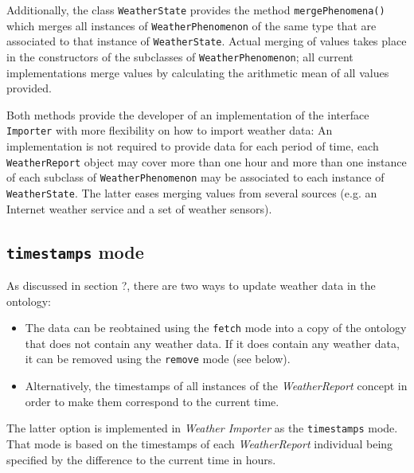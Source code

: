 Additionally, the class \texttt{WeatherState} provides the method \texttt{mergePhenomena()} which merges all instances of \texttt{WeatherPhenomenon} of the same type that are associated to that instance of \texttt{WeatherState}. Actual merging of values takes place in the constructors of the subclasses of \texttt{WeatherPhenomenon}; all current implementations merge values by calculating the arithmetic mean of all values provided.

Both methods provide the developer of an implementation of the interface \texttt{Importer} with more flexibility on how to import weather data: An implementation is not required to provide data for each period of time, each \texttt{WeatherReport} object may cover more than one hour and more than one instance of each subclass of \texttt{WeatherPhenomenon} may be associated to each instance of \texttt{WeatherState}. The latter eases merging values from several sources (e.g. an Internet weather service and a set of weather sensors).

\subsection{\texttt{timestamps} mode}

As discussed in section ?, there are two ways to update weather data in the \thinkhomeweather ontology:
\begin{itemize}
  \item The data can be reobtained using the \texttt{fetch} mode into a copy of the ontology that does not contain any weather data. If it does contain any weather data, it can be removed using the \texttt{remove} mode (see below).
  \item Alternatively, the timestamps of all instances of the \emph{WeatherReport} concept in order to make them correspond to the current time.
\end{itemize}

The latter option is implemented in \emph{Weather Importer} as the \texttt{timestamps} mode. That mode is based on the timestamps of each \emph{WeatherReport} individual being specified by the difference to the current time in hours.

